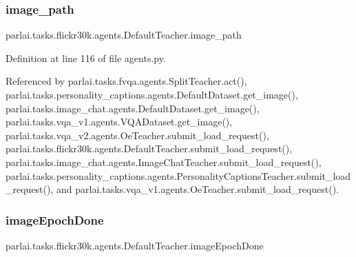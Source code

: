 \mbox{\label{classparlai_1_1tasks_1_1flickr30k_1_1agents_1_1DefaultTeacher_afbcd6505a2f71a7f55429ea316c2a7ea}} 
\subsubsection{\texorpdfstring{image\+\_\+path}{image\_path}}
{\footnotesize\ttfamily parlai.\+tasks.\+flickr30k.\+agents.\+Default\+Teacher.\+image\+\_\+path}



Definition at line 116 of file agents.\+py.



Referenced by parlai.\+tasks.\+fvqa.\+agents.\+Split\+Teacher.\+act(), parlai.\+tasks.\+personality\+\_\+captions.\+agents.\+Default\+Dataset.\+get\+\_\+image(), parlai.\+tasks.\+image\+\_\+chat.\+agents.\+Default\+Dataset.\+get\+\_\+image(), parlai.\+tasks.\+vqa\+\_\+v1.\+agents.\+V\+Q\+A\+Dataset.\+get\+\_\+image(), parlai.\+tasks.\+vqa\+\_\+v2.\+agents.\+Oe\+Teacher.\+submit\+\_\+load\+\_\+request(), parlai.\+tasks.\+flickr30k.\+agents.\+Default\+Teacher.\+submit\+\_\+load\+\_\+request(), parlai.\+tasks.\+image\+\_\+chat.\+agents.\+Image\+Chat\+Teacher.\+submit\+\_\+load\+\_\+request(), parlai.\+tasks.\+personality\+\_\+captions.\+agents.\+Personality\+Captions\+Teacher.\+submit\+\_\+load\+\_\+request(), and parlai.\+tasks.\+vqa\+\_\+v1.\+agents.\+Oe\+Teacher.\+submit\+\_\+load\+\_\+request().

\mbox{\label{classparlai_1_1tasks_1_1flickr30k_1_1agents_1_1DefaultTeacher_a5998c19d0306b5571d17aa38bbc22f73}} 
\subsubsection{\texorpdfstring{image\+Epoch\+Done}{imageEpochDone}}
{\footnotesize\ttfamily parlai.\+tasks.\+flickr30k.\+agents.\+Default\+Teacher.\+image\+Epoch\+Done}



